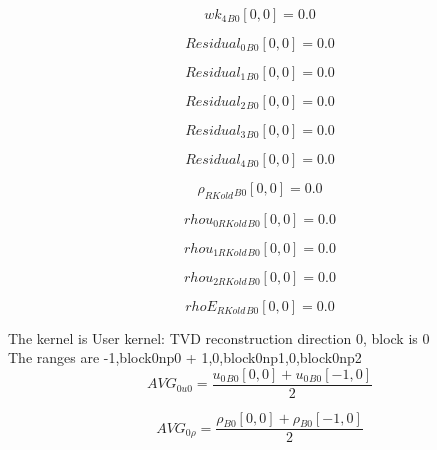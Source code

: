 \documentclass{article}
\begin{document}
\begin{dmath}{wk_{4}{_{B0}}}[{0,0}] = 0.0\end{dmath}

\begin{dmath}{Residual_{0}{_{B0}}}[{0,0}] = 0.0\end{dmath}

\begin{dmath}{Residual_{1}{_{B0}}}[{0,0}] = 0.0\end{dmath}

\begin{dmath}{Residual_{2}{_{B0}}}[{0,0}] = 0.0\end{dmath}

\begin{dmath}{Residual_{3}{_{B0}}}[{0,0}] = 0.0\end{dmath}

\begin{dmath}{Residual_{4}{_{B0}}}[{0,0}] = 0.0\end{dmath}

\begin{dmath}{\rho_{RKold}{_{B0}}}[{0,0}] = 0.0\end{dmath}

\begin{dmath}{rhou_{0 RKold}{_{B0}}}[{0,0}] = 0.0\end{dmath}

\begin{dmath}{rhou_{1 RKold}{_{B0}}}[{0,0}] = 0.0\end{dmath}

\begin{dmath}{rhou_{2 RKold}{_{B0}}}[{0,0}] = 0.0\end{dmath}

\begin{dmath}{rhoE_{RKold}{_{B0}}}[{0,0}] = 0.0\end{dmath}

\noindent The kernel is User kernel: TVD reconstruction direction 0, block is 0\\\noindent The ranges are -1,block0np0 + 1,0,block0np1,0,block0np2\\\begin{dmath}AVG_{0 u0} = \frac{{u_{0}{_{B0}}}[{0,0}] + {u_{0}{_{B0}}}[{-1,0}]}{2}\end{dmath}

\begin{dmath}AVG_{0 \rho} = \frac{{\rho{_{B0}}}[{0,0}] + {\rho{_{B0}}}[{-1,0}]}{2}\end{dmath}
\end{document}
